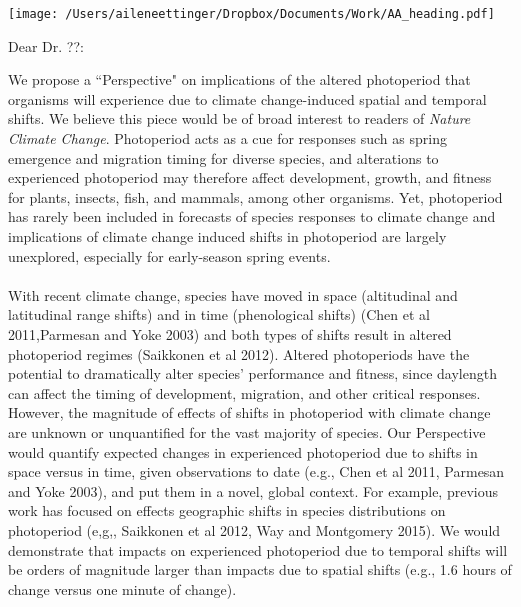 \documentclass[11pt,a4paper]{letter}
\begin{document}

\begin{letter}{}
\texttt{[image: /Users/aileneettinger/Dropbox/Documents/Work/AA\_heading.pdf]}

\opening{Dear Dr. ??:}
We propose a ``Perspective" on implications of the altered photoperiod that organisms will experience due to climate change-induced spatial and temporal shifts. 
We believe this piece would be of broad interest to readers of \emph{Nature Climate Change}. Photoperiod acts as a cue for responses such as spring emergence and migration timing for diverse species, and alterations to experienced photoperiod may therefore affect development, growth, and fitness for plants, insects, fish, and mammals, among other organisms. Yet, photoperiod has rarely been included in forecasts of species responses to climate change and implications of climate change induced shifts in photoperiod are largely unexplored, especially for early-season spring events. 
\\
\\
With recent climate change, species have moved in space (altitudinal and latitudinal range shifts) and in time (phenological shifts) (Chen et al 2011,Parmesan and Yoke 2003) and both types of shifts result in altered photoperiod regimes (Saikkonen et al 2012).  Altered photoperiods have the potential to dramatically alter species' performance and fitness, since daylength can affect the timing of development, migration, and other critical responses.  However, the magnitude of effects of shifts in photoperiod with climate change are unknown or unquantified for the vast majority of species.  Our Perspective would quantify expected changes in experienced photoperiod due to shifts in space versus in time, given observations to date (e.g., Chen et al 2011, Parmesan and Yoke 2003), and put them in a novel, global context. For example, previous work has focused on effects geographic shifts in species distributions on photoperiod (e,g,, Saikkonen et al 2012, Way and Montgomery 2015). We would demonstrate that impacts on experienced photoperiod due to temporal shifts will be orders of magnitude larger than impacts due to spatial shifts (e.g., 1.6 hours of change versus one minute of change). 
\\
\\

\end{letter}
\end{document}
